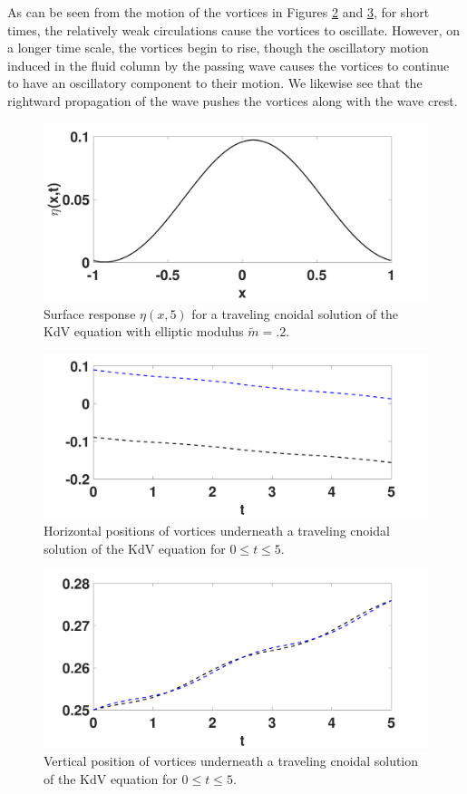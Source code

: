 \documentclass[a4paper,11pt]{article}
\begin{document}
As can be seen from the motion of the vortices in Figures \ref{fig:cnxtrackpt1} and \ref{fig:cnztrackpt1}, for short times, the relatively weak circulations cause the vortices to oscillate.  However, on a longer time scale, the vortices begin to rise, though the oscillatory motion induced in the fluid column by the passing wave causes the vortices to continue to have an oscillatory component to their motion.  We likewise see that the rightward propagation of the wave pushes the vortices along with the wave crest.  %
\begin{figure}[!h]
\centering
\includegraphics[width=.75\textwidth]{surf_resp_cnoid_mu_pt2_F_pt02_tf_5}
\caption{Surface response $\eta(x,5)$ for a traveling cnoidal solution of the KdV equation with elliptic modulus $\tilde{m}=.2$.}
\label{fig:surfrepcn}
\end{figure}
\begin{figure}[!h]
\centering
\includegraphics[width=.75\textwidth]{xtrack_cnoid_mu_pt2_F_pt02_tf_5}
\caption{Horizontal positions of vortices underneath a traveling cnoidal solution of the KdV equation for $0\leq t \leq 5$.}
\label{fig:cnxtrackpt1}
\end{figure}
\begin{figure}[!h]
\centering
\includegraphics[width=.75\textwidth]{ztrack_cnoid_mu_pt2_F_pt02_tf_5}
\caption{Vertical position of vortices underneath a traveling cnoidal solution of the KdV equation for $0\leq t \leq 5$.}
\label{fig:cnztrackpt1}
\end{figure}
\end{document}
